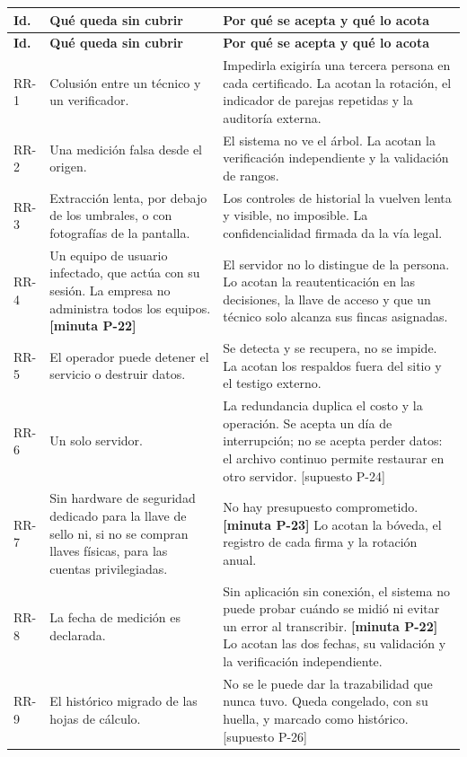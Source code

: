 \documentclass[11pt,letterpaper]{article}
\newcommand{\cab}[1]{\textbf{\rmfamily #1}}
\newcommand{\resp}[1]{\textrm{\footnotesize\bfseries [minuta #1]}}
\newcommand{\supu}[1]{\textrm{\footnotesize [supuesto #1]}}
\begin{document}
{\small
\renewcommand{\arraystretch}{1.13}
\begin{longtable}{@{}L{1.25cm} L{4.9cm} L{9.5cm}@{}}
\toprule
\cab{Id.} & \cab{Qué queda sin cubrir} & \cab{Por qué se acepta y qué lo acota} \\
\midrule
\endfirsthead
\toprule
\cab{Id.} & \cab{Qué queda sin cubrir} & \cab{Por qué se acepta y qué lo acota} \\
\midrule
\endhead
\bottomrule
\endfoot
RR-1 & Colusión entre un técnico y un verificador. & Impedirla exigiría una tercera persona en cada certificado. La acotan la rotación, el indicador de parejas repetidas y la auditoría externa. \\
RR-2 & Una medición falsa desde el origen. & El sistema no ve el árbol. La acotan la verificación independiente y la validación de rangos. \\
RR-3 & Extracción lenta, por debajo de los umbrales, o con fotografías de la pantalla. & Los controles de historial la vuelven lenta y visible, no imposible. La confidencialidad firmada da la vía legal. \\
RR-4 & Un equipo de usuario infectado, que actúa con su sesión. La empresa no administra todos los equipos. \resp{P-22} & El servidor no lo distingue de la persona. Lo acotan la reautenticación en las decisiones, la llave de acceso y que un técnico solo alcanza sus fincas asignadas. \\
RR-5 & El operador puede detener el servicio o destruir datos. & Se detecta y se recupera, no se impide. La acotan los respaldos fuera del sitio y el testigo externo. \\
RR-6 & Un solo servidor. & La redundancia duplica el costo y la operación. Se acepta un día de interrupción; no se acepta perder datos: el archivo continuo permite restaurar en otro servidor. \supu{P-24} \\
RR-7 & Sin hardware de seguridad dedicado para la llave de sello ni, si no se compran llaves físicas, para las cuentas privilegiadas. & No hay presupuesto comprometido. \resp{P-23} Lo acotan la bóveda, el registro de cada firma y la rotación anual. \\
RR-8 & La fecha de medición es declarada. & Sin aplicación sin conexión, el sistema no puede probar cuándo se midió ni evitar un error al transcribir. \resp{P-22} Lo acotan las dos fechas, su validación y la verificación independiente. \\
RR-9 & El histórico migrado de las hojas de cálculo. & No se le puede dar la trazabilidad que nunca tuvo. Queda congelado, con su huella, y marcado como histórico. \supu{P-26} \\

\end{longtable}}
\end{document}
